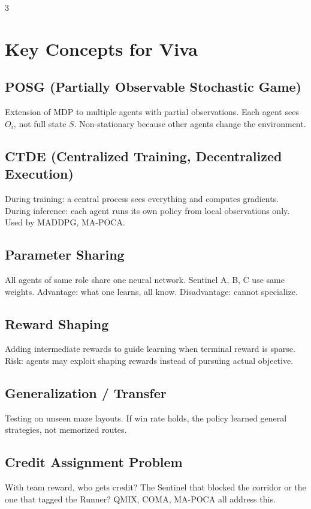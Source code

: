 \documentclass[10pt,landscape,a4paper]{article}
\begin{document}
\begin{multicols}{3}
\section{Key Concepts for Viva}

\subsection{POSG (Partially Observable Stochastic Game)}
Extension of MDP to multiple agents with partial observations. Each agent sees $O_i$, not full state $S$. Non-stationary because other agents change the environment.

\subsection{CTDE (Centralized Training, Decentralized Execution)}
During training: a central process sees everything and computes gradients. During inference: each agent runs its own policy from local observations only. Used by MADDPG, MA-POCA.

\subsection{Parameter Sharing}
All agents of same role share one neural network. Sentinel A, B, C use same weights. Advantage: what one learns, all know. Disadvantage: cannot specialize.

\subsection{Reward Shaping}
Adding intermediate rewards to guide learning when terminal reward is sparse. Risk: agents may exploit shaping rewards instead of pursuing actual objective.

\subsection{Generalization / Transfer}
Testing on unseen maze layouts. If win rate holds, the policy learned general strategies, not memorized routes.

\subsection{Credit Assignment Problem}
With team reward, who gets credit? The Sentinel that blocked the corridor or the one that tagged the Runner? QMIX, COMA, MA-POCA all address this.


\end{multicols}
\end{document}
